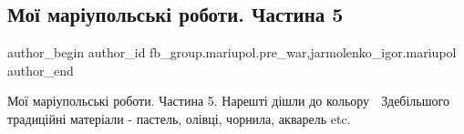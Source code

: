  
 
 
 
 

\subsection{Мої маріупольські роботи. Частина 5}
\label{sec:31_01_2023.fb.fb_group.mariupol.pre_war.4.mo__mar_upolsk__robo}
 
\ifcmt
 author_begin
   author_id fb_group.mariupol.pre_war,jarmolenko_igor.mariupol
 author_end
\fi

Мої маріупольські роботи. Частина 5. Нарешті дішли до кольору 🙂 Здебільшого
традиційні матеріали - пастель, олівці, чорнила, акварель etc.
